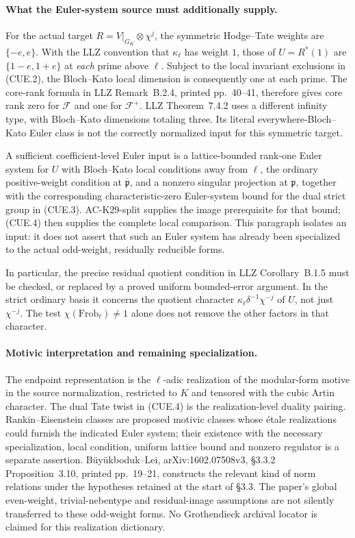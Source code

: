 \paragraph{What the Euler-system source must additionally supply.}
For the actual target $R=V|_{G_K}\otimes\chi^j$, the symmetric
Hodge--Tate weights are $\{-e,e\}$.  With the LLZ convention that
$\kappa_\ell$ has weight $1$, those of $U=R^*(1)$ are
$\{1-e,1+e\}$ at \emph{each} prime above $\ell$.
Subject to the local invariant exclusions in (CUE.2), the
Bloch--Kato local dimension is consequently one at each prime.
The core-rank formula in LLZ Remark~B.2.4, printed pp.~40--41,
therefore gives core rank zero for $\mathcal F$ and one for
$\mathcal F^+$.  LLZ Theorem~7.4.2 uses a different infinity type,
with Bloch--Kato dimensions totaling three.  Its literal
everywhere-Bloch--Kato Euler class is not the correctly normalized
input for this symmetric target.

A sufficient coefficient-level Euler input is a lattice-bounded
rank-one Euler system for $U$ with Bloch--Kato local conditions
away from $\ell$, the ordinary positive-weight condition at
$\overline{\mathfrak p}$, and a nonzero singular projection at
$\mathfrak p$, together with the corresponding
characteristic-zero Euler-system bound for the dual strict group
in (CUE.3).  AC-K29-split supplies the image prerequisite for
that bound; (CUE.4) then supplies the complete local comparison.
This paragraph isolates an input: it does not assert that such
an Euler system has already been specialized to the actual
odd-weight, residually reducible forms.

In particular, the precise residual quotient condition in LLZ
Corollary~B.1.5 must be checked, or replaced by a proved uniform
bounded-error argument.  In the strict ordinary basis it concerns
the quotient character
$\kappa_\ell\delta^{-1}\chi^{-j}$ of $U$, not just $\chi^{-j}$.
The test $\chi(\mathrm{Frob}_\ell)\ne1$ alone does not remove
the other factors in that character.

\paragraph{Motivic interpretation and remaining specialization.}
The endpoint representation is the $\ell$-adic realization of
the modular-form motive in the source normalization, restricted
to $K$ and tensored with the cubic Artin character.  The dual
Tate twist in (CUE.4) is the realization-level duality pairing.
Rankin--Eisenstein classes are proposed motivic classes whose
\'etale realizations could furnish the indicated Euler system;
their existence with the necessary specialization, local
condition, uniform lattice bound and nonzero regulator is a
separate assertion.  B\"uy\"ukboduk--Lei, arXiv:1602.07508v3,
\S3.3.2 Proposition~3.10, printed pp.~19--21, constructs the
relevant kind of norm relations under the hypotheses retained
at the start of \S3.3.  The paper's global even-weight,
trivial-nebentype and residual-image assumptions are not silently
transferred to these odd-weight forms.  No Grothendieck archival
locator is claimed for this realization dictionary.
